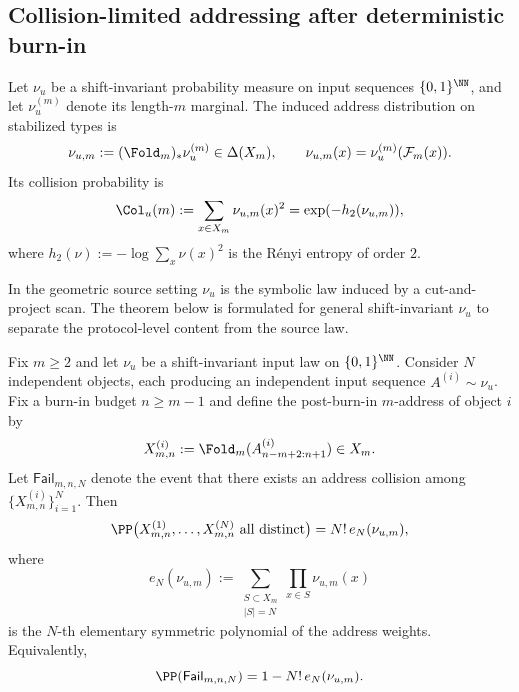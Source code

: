 \subsection{Collision-limited addressing after deterministic burn-in}\label{sec:causality:capacity}

\begin{definition}\label{def:collision}
Let $\nu_u$ be a shift-invariant probability measure on input sequences $\{0,1\}^{\NN}$, and let $\nu_u^{(m)}$ denote its length-$m$ marginal. The induced address distribution on stabilized types is
\[
\nu_{u,m}:=(\Fold_m)_*\nu_u^{(m)}\in\Delta(X_m),
\qquad
\nu_{u,m}(x)=\nu_u^{(m)}(\mathcal{F}_m(x)).
\]
Its collision probability is
\[
\Col_u(m):=\sum_{x\in X_m}\nu_{u,m}(x)^2=\exp(-h_2(\nu_{u,m})),
\]
where $h_2(\nu):=-\log\sum_x \nu(x)^2$ is the R\'enyi entropy of order $2$.
\end{definition}

\begin{remark}
In the geometric source setting $\nu_u$ is the symbolic law induced by a cut-and-project scan. The theorem below is formulated for general shift-invariant $\nu_u$ to separate the protocol-level content from the source law.
\end{remark}

\begin{theorem}\label{thm:exact-occupancy}
Fix $m\ge 2$ and let $\nu_u$ be a shift-invariant input law on $\{0,1\}^{\NN}$. Consider $N$ independent objects, each producing an independent input sequence $A^{(i)}\sim\nu_u$. Fix a burn-in budget $n\ge m-1$ and define the post-burn-in $m$-address of object $i$ by
\[
X^{(i)}_{m,n}:=\Fold_m(A^{(i)}_{n-m+2:n+1})\in X_m.
\]
Let $\mathsf{Fail}_{m,n,N}$ denote the event that there exists an address collision among $\{X^{(i)}_{m,n}\}_{i=1}^N$. Then
\begin{equation}\label{eq:exact-occupancy}
\PP\bigl(X^{(1)}_{m,n},\dots,X^{(N)}_{m,n}\text{ all distinct}\bigr)=N!\,e_N(\nu_{u,m}),
\end{equation}
where
\[
e_N(\nu_{u,m})
:=
\sum_{\substack{S\subset X_m\\|S|=N}}
\prod_{x\in S}\nu_{u,m}(x)
\]
is the $N$-th elementary symmetric polynomial of the address weights. Equivalently,
\begin{equation}\label{eq:exact-failure}
\PP(\mathsf{Fail}_{m,n,N})=1-N!\,e_N(\nu_{u,m}).
\end{equation}
\end{theorem}

